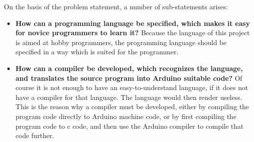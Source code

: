 On the basis of the problem statement, a number of sub-statements arises:
\begin{itemize}
	\item \textbf{How can a programming language be specified, which makes it easy for novice programmers to learn it?} Because the language of this project is aimed at hobby programmers, the programming language should be specified in a way which is suited for the programmer.
	\item \textbf{How can a compiler be developed, which recognizes the language, and translates the source program into Arduino suitable code?} Of course it is not enough to have an easy-to-understand language, if it does not have a compiler for that language. The language would then render useless. This is the reason why a compiler must be developed, either by compiling the program code directly to Arduino machine code, or by first compiling the program code to c code, and then use the Arduino compiler to compile that code further. 
\end{itemize}